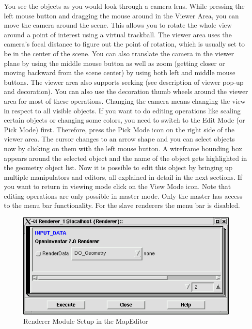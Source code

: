 You see the objects as you would look through a camera lens. While pressing
the left mouse button and dragging the mouse around in the Viewer Area, you
can move the camera around the scene. This allows you to rotate the whole view
around a point of interest using a virtual trackball. The viewer area uses the
camera's focal distance to figure out the point of rotation, which is usually
set to be in the center of the scene. You can also translate the camera in the
viewer plane by using the middle mouse button as well as zoom (getting closer
or moving backward from the scene center) by using both left and middle mouse
buttons. The viewer area also supports seeking (see description of viewer pop-up
and decoration). You can also use the decoration thumb wheels around the viewer
area for most of these operations. Changing the camera means changing the view
in respect to all visible objects. If you want to do editing operations like
scaling certain objects or changing some colors, you need to switch to the Edit
Mode (or Pick Mode) first. Therefore, press the Pick Mode icon on the right
side of the viewer area. The cursor changes to an arrow shape and you can select
objects now by clicking on them with the left mouse button. A wireframe bounding
box appears around the selected object and the name of the object gets highlighted
in the geometry object list. Now it is possible to edit this object by bringing
up multiple manipulators and editors, all explained in detail in the next
sections. If you want to return in viewing mode click on the View Mode icon.
Note that editing operations are only possible in master mode. Only the master
has access to the menu bar functionality. For the slave renderers the menu bar is disabled.

 \latexonly
 \begin{figure}[htp]
  \begin{center}
   \includegraphics[scale=0.7]{renderer/pict/image2}
   \caption{Renderer Module Setup in the MapEditor}
	\label{fig49}
  \end{center}
 \end{figure}
 \endlatexonly

